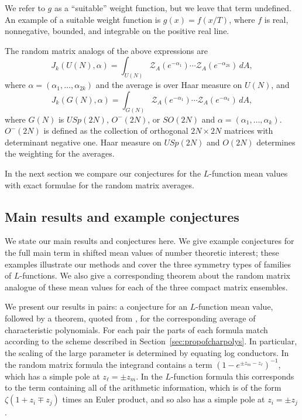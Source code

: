 \documentclass[12pt,letterpaper]{amsart}
\theoremstyle{plain}
\theoremstyle{definition}
\theoremstyle{remark}
\numberwithin{equation}{subsection}
\numberwithin{theorem}{subsection}
\numberwithin{table}{subsection}
\begin{document}
We refer to $g$ as a ``suitable'' weight function, but we leave
that term undefined. An example of a suitable weight function is
$g(x) =  f(x/T)$, where $f$ is real, nonnegative, bounded, and
integrable on the positive real line.

The random matrix analogs of the above expressions are
\begin{equation}
J_k(U(N),\alpha) =\int_{U(N)} {\mathcal Z}_A(e^{-\alpha_{1}}) \cdots
{\mathcal Z}_A(e^{-\alpha_{2k}})\,dA,
\end{equation}
where $\alpha=(\alpha_1,\ldots,\alpha_{2k})$ and the average is
over Haar measure on $U(N)$, and
\begin{equation}
J_k(G(N),\alpha)=\int_{G(N)} {\mathcal Z}_A(e^{-\alpha_1})\cdots {\mathcal
Z} _A(e^{-\alpha_k}) \,dA,
\end{equation}
where $G(N)$ is $USp(2N)$, $O^-(2N)$, or $SO(2N)$ and
$\alpha=(\alpha_1,\ldots, \alpha_{ k})$.  $O^-(2N)$ is defined as
the collection of orthogonal $2N\times 2N$ matrices with
determinant negative one.  Haar measure on $USp(2N)$ and $O(2N)$
determines the weighting for the averages.

In the next section we compare our conjectures for the
$L$-function mean values with exact formulae for the random matrix
averages.


\subsection{  Main results and example conjectures
}\label{sec:mainconjectures}



We state our main results and conjectures here. We give example
conjectures for the full main term in shifted mean values of
number theoretic interest; these examples illustrate our methods
and cover the three symmetry types of families of $L$-functions.
We also give a corresponding theorem about the random matrix
analogue of these mean values for each of the three compact matrix
ensembles.

We present our results in pairs: a conjecture for an $L$-function
mean value, followed by a theorem, quoted from \cite{CFKRS},
for the corresponding average of
characteristic polynomials.  
For each pair the parts of each
formula match according to the scheme described in Section~\ref{sec:propofcharpolys}. 
In particular, the scaling of the large parameter is determined
by equating log conductors.
In
the random matrix formula the integrand contains a term $(1-e^{\pm
z_m - z_\ell})^{-1}$, which has a simple pole at $z_{\ell}= \pm
z_m$. In the $L$-function formula this corresponds to the term
containing all of the arithmetic information, which is of the form
$\zeta(1+z_i \mp z_j)$ times an Euler product, and so also has
a simple pole at $z_i =\pm z_j$.
\end{document}
